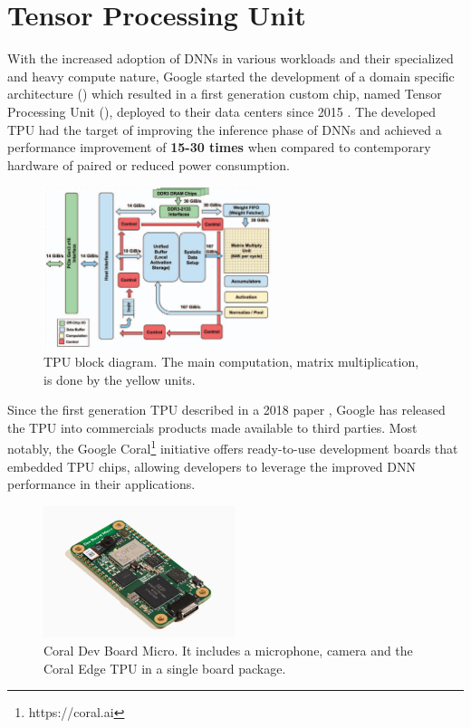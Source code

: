 \documentclass[openright]{normas-utf-tex} %
\begin{document}
\section{Tensor Processing Unit}
\label{sec:TPU}

With the increased adoption of DNNs in various workloads and their specialized
and heavy compute nature, Google started the development of a domain specific
architecture () which resulted in a
first generation custom chip, named Tensor Processing Unit (), deployed to their data centers since 2015 \cite{Google2015}.
The developed TPU had the target of improving the inference phase of DNNs and
achieved a performance improvement of \textbf{15-30 times} when compared to
contemporary hardware of paired or reduced power consumption.

\begin{figure}[H]
	\centering
	\includegraphics[width=0.6\textwidth]{./images/tpublock.png}
	\caption[TPU block diagram]{TPU block diagram. The main computation, matrix multiplication, is done by the yellow units.}
	\label{fig:gauge1}
\end{figure}

Since the first generation TPU described in a 2018 paper \cite{Google2015},
Google has released the TPU into commercials products made available to third
parties. Most notably, the Google Coral\footnote{https://coral.ai} initiative
offers ready-to-use development boards that embedded TPU chips, allowing
developers to leverage the improved DNN performance in their applications.

\begin{figure}[H]
	\centering
	\includegraphics[width=0.5\textwidth]{./images/coralboard.png}
	\caption[Coral Dev Board Micro]{Coral Dev Board Micro. It includes a microphone, camera and the Coral Edge TPU in a single board package.}
\end{figure}
\end{document}
